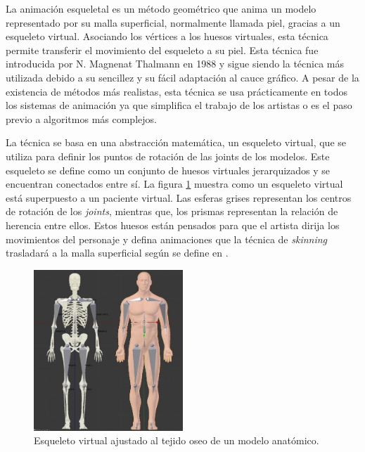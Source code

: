 La animación esqueletal es un método geométrico que anima un modelo representado por su malla superficial, normalmente llamada piel, gracias a un esqueleto virtual. Asociando los vértices a los huesos virtuales, esta técnica permite transferir el movimiento del esqueleto a su piel. Esta técnica fue introducida por N. Magnenat Thalmann en 1988 \cite{thalmann88} y sigue siendo la técnica más utilizada debido a su sencillez y su fácil adaptación al cauce gráfico. A pesar de la existencia de métodos más realistas, esta técnica se usa prácticamente en todos los sistemas de animación ya que simplifica el trabajo de los artistas o es el paso previo a algoritmos más complejos. %

La técnica se basa en una abstracción matemática, un esqueleto virtual, que se utiliza para definir los puntos de rotación de las \ac{joints} de los modelos. Este esqueleto se define como un conjunto de huesos virtuales jerarquizados y se encuentran conectados entre sí. La figura \ref{fig:virtualskeleton} muestra como un esqueleto virtual está superpuesto a un paciente virtual. Las esferas grises representan los centros de rotación de los \emph{\ac{joints}}, mientras que, los prismas representan la relación de herencia entre ellos. Estos huesos están pensados para que el artista dirija los movimientos del personaje y defina animaciones que la técnica de \emph{skinning} trasladará a la malla superficial según se define en \cite{thalmann88}. 

\begin{figure}[h]
   \centering
    \includegraphics[width=0.5\textwidth]{IMG/virtualskeleton.png}
    \caption{Esqueleto virtual ajustado al tejido oseo de un modelo anatómico.}
   \label{fig:virtualskeleton}
\end{figure}

